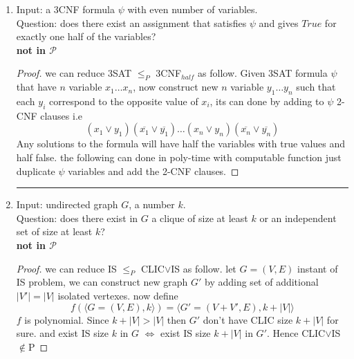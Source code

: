 \documentclass[12pt]{article}
\begin{document}
\begin{enumerate}[label=(\alph*)]
\begin{proof}
\end{proof}
\hrule 
\item 
Input: a 3CNF formula $\psi$ with even number of variables.
\\Question: does there exist an assignment that satisfies  $\psi$   and gives  $True$ 
for exactly one half of the variables?
\\ \textbf{ not in  $\mathcal{P}$}
\begin{proof}
we can reduce 3SAT $ \le_P$ 3CNF$_{half}$ as follow. Given 3SAT formula $\psi$ that have $n$ variable $x_1\dots x_n$, now construct new $n$ variable $y_1\dots y_n$ such that each $y_i$ correspond to the opposite value of  $x_i$, its can done by adding to $\psi$ 2-CNF clauses i.e \[(x_1 \vee y_1)(\overline{x_1}\vee \overline{y_1})\dots(x_n \vee y_n)(\overline{x_n}\vee \overline{y_n})\]
Any solutions to the formula will have half the variables with true values and half false. the following can done in poly-time with  computable function just duplicate  $\psi$ variables  and add the  2-CNF clauses. 
\end{proof}
\hrule 

\item 
Input: undirected graph $G$, a number $k$.
\\Question: does there exist in $G$ a clique of size at least $k$ or an independent set of size at least $k$?
\\ \textbf{ not in  $\mathcal{P}$}\begin{proof} we can reduce IS $ \le_P$ CLIC$\vee$IS as follow. let $G=(V,E)$ instant of IS problem, we can construct new graph $G'$ by adding set of additional $|V'|=|V|$ isolated vertexes. now define \[f(\langle G=(V,E) ,k \rangle)=\langle G'=(V+V',E) ,k+|V| \rangle\]
$f$ is polynomial. Since $k+|V|>|V|$ then $G'$ don't have CLIC size $k+|V|$ for sure. and exist IS size $k$ in $G$ $\Leftrightarrow$ exist IS size $k+|V|$ in $G'$. Hence CLIC$\vee$IS $\notin$P
\end{proof}
\end{enumerate}
\end{document}
